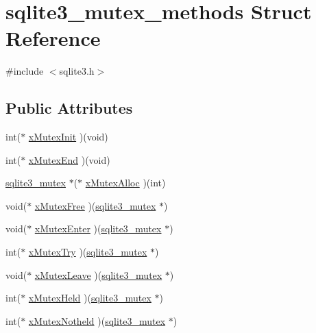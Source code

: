 \hypertarget{structsqlite3__mutex__methods}{\section{sqlite3\-\_\-mutex\-\_\-methods Struct Reference}
\label{structsqlite3__mutex__methods}
}


{\ttfamily \#include $<$sqlite3.\-h$>$}

\subsection*{Public Attributes}
\begin{DoxyCompactItemize}
\item 
int($\ast$ \hyperlink{structsqlite3__mutex__methods_af0a78d79b6029444d4a2ac7c474030d4}{x\-Mutex\-Init} )(void)
\item 
int($\ast$ \hyperlink{structsqlite3__mutex__methods_a4963efb4bfede244d4d2a14510dbfe68}{x\-Mutex\-End} )(void)
\item 
\hyperlink{structsqlite3__mutex}{sqlite3\-\_\-mutex} $\ast$($\ast$ \hyperlink{structsqlite3__mutex__methods_a1092d5c1659c494c5235e884def5e275}{x\-Mutex\-Alloc} )(int)
\item 
void($\ast$ \hyperlink{structsqlite3__mutex__methods_a4e58d446a7225ce91073eb0af91d219a}{x\-Mutex\-Free} )(\hyperlink{structsqlite3__mutex}{sqlite3\-\_\-mutex} $\ast$)
\item 
void($\ast$ \hyperlink{structsqlite3__mutex__methods_ac60f7bb165e9770949a8a2b2c2632830}{x\-Mutex\-Enter} )(\hyperlink{structsqlite3__mutex}{sqlite3\-\_\-mutex} $\ast$)
\item 
int($\ast$ \hyperlink{structsqlite3__mutex__methods_a45682df41bdfcb267a696090c80ebd06}{x\-Mutex\-Try} )(\hyperlink{structsqlite3__mutex}{sqlite3\-\_\-mutex} $\ast$)
\item 
void($\ast$ \hyperlink{structsqlite3__mutex__methods_acfa193f9130bfc68caf7f1849bcd0dac}{x\-Mutex\-Leave} )(\hyperlink{structsqlite3__mutex}{sqlite3\-\_\-mutex} $\ast$)
\item 
int($\ast$ \hyperlink{structsqlite3__mutex__methods_a5d30a95c614bc08fe156c9ea0f0d88e8}{x\-Mutex\-Held} )(\hyperlink{structsqlite3__mutex}{sqlite3\-\_\-mutex} $\ast$)
\item 
int($\ast$ \hyperlink{structsqlite3__mutex__methods_a7bc1edfd01c67c6dcee26299bc31a7bf}{x\-Mutex\-Notheld} )(\hyperlink{structsqlite3__mutex}{sqlite3\-\_\-mutex} $\ast$)
\end{DoxyCompactItemize}


